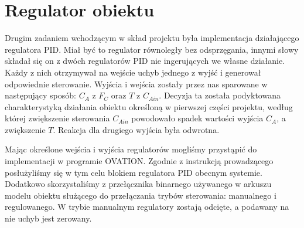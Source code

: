 \chapter{Regulator obiektu}
Drugim zadaniem wchodzącym w skład projektu była implementacja działającego regulatora PID. Miał być to regulator równoległy bez odsprzęgania, innymi słowy składał się on z dwóch regulatorów PID nie ingerujących we własne działanie. Każdy z nich otrzymywał na wejście uchyb jednego z wyjść i generował odpowiednie sterowanie. Wyjścia i wejścia zostały przez nas sparowane w następujący sposób: $C_A$ z $F_C$ oraz $T$ z $C_{Ain}$.
Decyzja ta została podyktowana charakterystyką działania obiektu określoną w pierwszej części projektu, według której zwiększenie sterowania $C_{Ain}$ powodowało spadek wartości wyjścia $C_A$, a zwiększenie $T$. Reakcja dla drugiego wyjścia była odwrotna.

Mając określone wejścia i wyjścia regulatorów mogliśmy przystąpić do implementacji w programie OVATION. Zgodnie z instrukcją prowadzącego posłużyliśmy się w tym celu blokiem regulatora PID obecnym systemie. Dodatkowo skorzystaliśmy z przełącznika binarnego używanego w arkuszu modelu obiektu służącego do przełączania trybów sterowania: manualnego i regulowanego. W trybie manualnym regulatory zostają odcięte, a podawany na nie uchyb jest zerowany.

